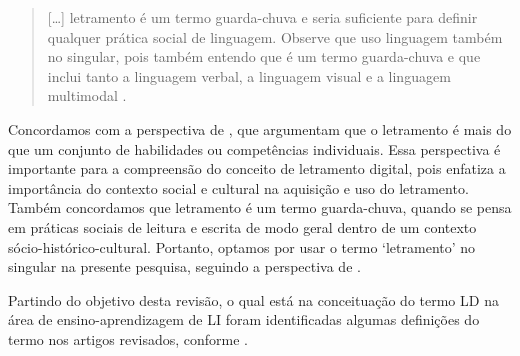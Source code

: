 \begin{quote}
{[}\ldots{]} letramento é um termo guarda-chuva e seria suficiente para
definir qualquer prática social de linguagem. Observe que uso linguagem
também no singular, pois também entendo que é um termo guarda-chuva e
que inclui tanto a linguagem verbal, a linguagem visual e a linguagem
multimodal \cite[p. 1165]{paiva2021letramento}.
\end{quote}

Concordamos com a perspectiva de \textcite[p. 18]{dudeney2016letramentos},
que argumentam que o letramento é mais do que um conjunto de habilidades
ou competências individuais. Essa perspectiva é importante para a
compreensão do conceito de letramento digital, pois enfatiza a
importância do contexto social e cultural na aquisição e uso do
letramento. Também concordamos que letramento é um termo guarda-chuva,
quando se pensa em práticas sociais de leitura e escrita de modo geral
dentro de um contexto sócio-histórico-cultural. Portanto, optamos por
usar o termo `letramento' no singular
na presente pesquisa, seguindo a perspectiva de \textcite{paiva2021letramento}.

Partindo do objetivo desta revisão, o qual está na conceituação do termo
LD na área de ensino-aprendizagem de LI foram identificadas algumas
definições do termo nos artigos revisados, conforme .

